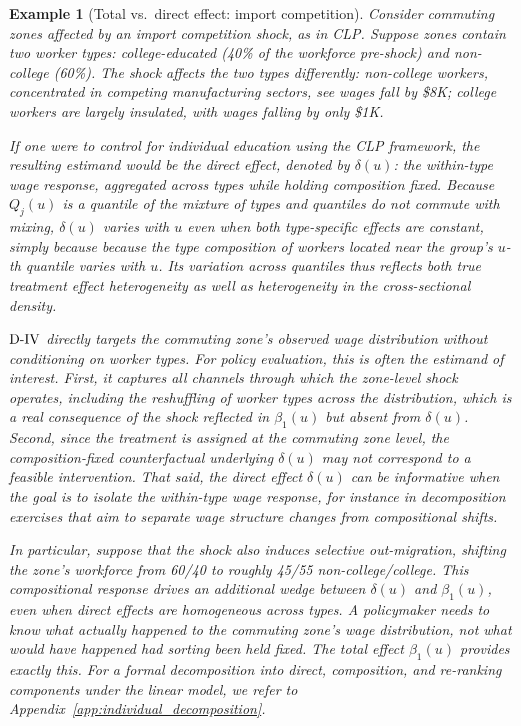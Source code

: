 \documentclass[12pt]{article}
\newcommand{\est}{\ensuremath{\textnormal{D-IV}}\xspace}
\newcommand{\CLP}{CLP\xspace}
\newtheorem{example}{Example}
\begin{document}
\begin{example}[Total vs.\ direct effect: import competition]
\label{ex:total_vs_direct}
Consider commuting zones affected by an import competition shock, as in \CLP.  Suppose zones contain two worker types: college-educated (40\% of the workforce pre-shock) and non-college (60\%). The shock affects the two types differently: non-college workers, concentrated in competing manufacturing sectors, see wages fall by \$8K; college workers are largely insulated, with wages falling by only \$1K.

If one were to control for individual education using the \CLP framework, the resulting estimand would be the direct effect, denoted by $\delta(u)$: the within-type wage response, aggregated across types while holding composition fixed. Because $Q_j(u)$ is a quantile of the \emph{mixture} of types and quantiles do not commute with mixing, $\delta(u)$ varies with $u$ even when both type-specific effects are constant, simply because because the type composition of workers located near the group's $u$-th quantile varies with $u$. Its variation across quantiles thus reflects both true treatment effect heterogeneity as well as heterogeneity in the cross-sectional density. 

$\est$ directly targets the commuting zone's observed wage distribution without conditioning on worker types. For policy evaluation, this is often the estimand of interest. First, it captures all channels through which the zone-level shock operates, including the reshuffling of worker types across the distribution, which is a real consequence of the shock reflected in $\beta_1(u)$ but absent from $\delta(u)$. Second, since the treatment is assigned at the commuting zone level, the composition-fixed counterfactual underlying $\delta(u)$ may not correspond to a feasible intervention. That said, the direct effect $\delta(u)$ can be informative when the goal is to isolate the within-type wage response, for instance in decomposition exercises that aim to separate wage structure changes from compositional shifts. 

In particular, suppose that the shock also induces selective out-migration, shifting the zone's workforce from 60/40 to roughly 45/55 non-college/college. This compositional response drives an additional wedge between $\delta(u)$ and $\beta_1(u)$, even when direct effects are homogeneous across types. A policymaker needs to know what \emph{actually happened} to the commuting zone's wage distribution, not what would have happened had sorting been held fixed. The total effect $\beta_1(u)$ provides exactly this. For a formal decomposition into direct, composition, and re-ranking components under the linear model, we refer to Appendix~\ref{app:individual_decomposition}.
\end{example}
\end{document}

